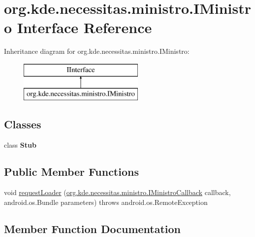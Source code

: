 \hypertarget{interfaceorg_1_1kde_1_1necessitas_1_1ministro_1_1_i_ministro}{}\section{org.\+kde.\+necessitas.\+ministro.\+I\+Ministro Interface Reference}
\label{interfaceorg_1_1kde_1_1necessitas_1_1ministro_1_1_i_ministro}
Inheritance diagram for org.\+kde.\+necessitas.\+ministro.\+I\+Ministro\+:\begin{figure}[H]
\begin{center}
\leavevmode
\includegraphics[height=2.000000cm]{interfaceorg_1_1kde_1_1necessitas_1_1ministro_1_1_i_ministro}
\end{center}
\end{figure}
\subsection*{Classes}
\begin{DoxyCompactItemize}
\item 
class {\bfseries Stub}
\end{DoxyCompactItemize}
\subsection*{Public Member Functions}
\begin{DoxyCompactItemize}
\item 
void \hyperlink{interfaceorg_1_1kde_1_1necessitas_1_1ministro_1_1_i_ministro_a3d7c6602e2f6151d53df20f674b97af1}{request\+Loader} (\hyperlink{interfaceorg_1_1kde_1_1necessitas_1_1ministro_1_1_i_ministro_callback}{org.\+kde.\+necessitas.\+ministro.\+I\+Ministro\+Callback} callback, android.\+os.\+Bundle parameters)  throws android.\+os.\+Remote\+Exception
\end{DoxyCompactItemize}


\subsection{Member Function Documentation}
\mbox{\label{interfaceorg_1_1kde_1_1necessitas_1_1ministro_1_1_i_ministro_a3d7c6602e2f6151d53df20f674b97af1}} 
